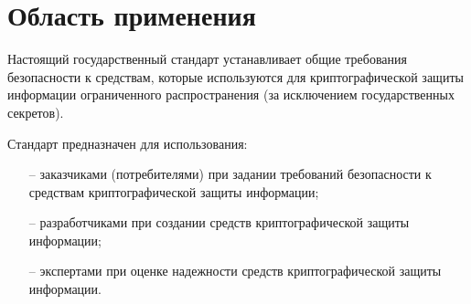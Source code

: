 \chapter{Область применения}\label{Scope}

Настоящий государственный стандарт устанавливает общие требования
безопасности к средствам, которые используются для криптографической защиты
информации ограниченного распространения (за исключением государственных
секретов).

Стандарт предназначен для использования:
\begin{itemize}
\item[--]
заказчиками (потребителями) при задании требований безопасности к
средствам криптографической защиты информации;

\item[--]
разработчиками при создании средств криптографической защиты информации;

\item[--]
экспертами при оценке надежности средств криптографической защиты 
информации. 
\end{itemize}

